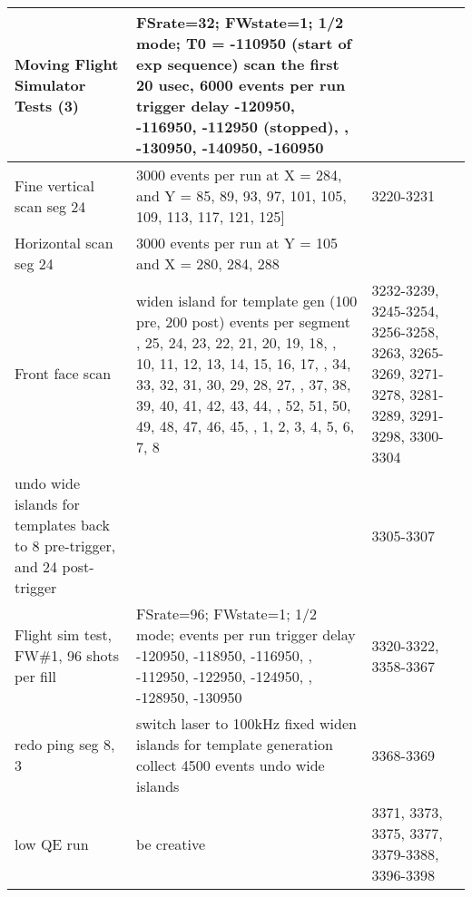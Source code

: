 \begin{landscape}
\begin{longtable}{|p{6cm}|p{10cm}|p{4cm}|}
Moving Flight Simulator Tests (3) & FSrate=32; FWstate=1; 1/2 mode; \newline T0 = -110950 (start of exp sequence) \newline scan the first 20 usec, 6000 events per run \newline trigger delay -120950, -116950, -112950 (stopped), \newline  -124950, -130950, -140950, -160950 & \\ \hline
Fine vertical scan seg 24 & 3000 events per run at X = 284, and Y = \newline {[}85, 89, 93, 97, 101, 105, 109, 113, 117, 121, 125{]} & 3220-3231 \\ \hline
Horizontal scan seg 24 & 3000 events per run at Y = 105 and X = 280, 284, 288 & \\ \hline
Front face scan & widen island for template gen (100 pre, 200 post) \newline 4500 events per segment \newline 26, 25, 24, 23, 22, 21, 20, 19, 18, \newline 9, 10, 11, 12, 13, 14, 15, 16, 17, \newline 35, 34, 33, 32, 31, 30, 29, 28, 27, \newline 36, 37, 38, 39, 40, 41, 42, 43, 44, \newline 53, 52, 51, 50, 49, 48, 47, 46, 45, \newline 0, 1, 2, 3, 4, 5, 6, 7, 8 & 3232-3239, 3245-3254, 3256-3258, 3263, 3265-3269, 3271-3278, 3281-3289, 3291-3298, 3300-3304\\ \hline
undo wide islands for templates back to 8 pre-trigger, and 24 post-trigger & & 3305-3307\\ \hline
Flight sim test, FW\#1, 96 shots per fill & FSrate=96; FWstate=1; 1/2 mode; \newline 9000 events per run \newline trigger delay -120950, -118950, -116950,  \newline -114950, -112950, -122950, -124950,  \newline -126950, -128950, -130950  & 3320-3322, 3358-3367\\ \hline
redo ping seg 8, 3 & switch laser to 100kHz fixed \newline widen islands for template generation \newline collect 4500 events \newline undo wide islands & 3368-3369\\ \hline
low QE run & be creative & 3371, 3373, 3375, 3377, 3379-3388, 3396-3398\\ \hline

\end{longtable}
\end{landscape}
